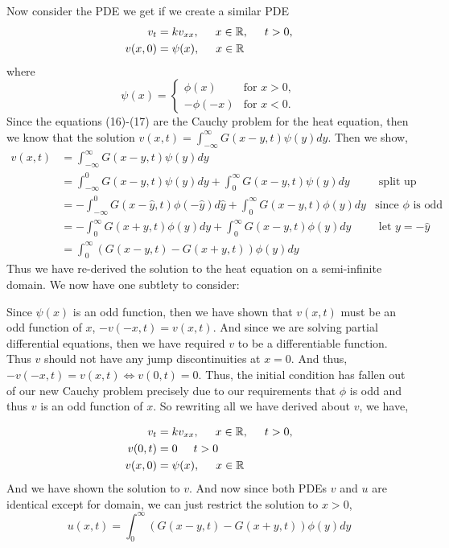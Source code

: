 \documentclass{article}
\begin{document}
\vspace{2mm} 
Now consider the PDE we get if we create a similar PDE 
\begin{align}
v_t&=kv_{xx}, \hspace{5mm} x\in\mathbb{R}, \hspace{5mm}t>0,\\
v(x,0)&= \psi(x), \hspace{5mm} x \in \mathbb{R} 
\end{align}
where 
\[
 \psi(x) =
  \begin{cases}
                                  \phi(x) & \text{for } x>0, \\
                                   -\phi(-x) & \text{for } x<0 .
  \end{cases}   
\]
Since the equations (16)-(17) are the Cauchy problem for the heat equation, then we know that the solution \(v(x,t)= \int_{-\infty}^{\infty} G(x-y,t)\psi(y) dy \). Then we show,
\begin{align*}
v(x,t) &=  \int_{-\infty}^{\infty} G(x-y,t)\psi(y) dy  \\
&=  \int_{-\infty}^{0} G(x-y,t)\psi(y) dy+ \int_{0}^{\infty} G(x-y,t)\psi(y) dy& \text{ split up integral} \\
&= - \int_{-\infty}^{0} G(x-\hat y,t)\phi(-\hat y) d\hat y+ \int_{0}^{\infty} G(x-y,t)\phi(y) dy& \text{since \(\phi \) is odd } \\
&= -\int_{0}^{\infty} G(x+y,t)\phi(y) dy+ \int_{0}^{\infty} G(x-y,t)\phi(y) dy& \text{ let \(y=-\hat y\)} \\
&= \int_{0}^{\infty} ( G(x-y,t)-G(x+y,t) )\phi(y) dy
\end{align*}
Thus we have re-derived the solution to the heat equation on a semi-infinite domain. We now have one subtlety to consider:

Since \(\psi(x)\) is an odd function, then we have shown that \(v(x,t)\) must be an odd function of \(x\), \(-v(-x,t)=v(x,t)\). And since we are solving partial differential equations, then we have required \(v \) to be a differentiable function. Thus \(v\) should not have any jump discontinuities at \(x=0\). And thus, \(-v(-x,t)=v(x,t) \iff v(0,t)=0  \). Thus, the initial condition has fallen out of our new Cauchy problem precisely due to our requirements that \(\phi \) is odd and thus \( v\) is an odd function of \(x\). So rewriting all we have derived about \(v\), we have, 

\begin{align}
v_t&=kv_{xx}, \hspace{5mm} x\in\mathbb{R}, \hspace{5mm}t>0,\\
v(0,t) &= 0  \hspace{5mm} t>0 \\
v(x,0)&= \psi(x), \hspace{5mm} x \in \mathbb{R} 
\end{align}
And we have shown the solution to \(v\). And now since both PDEs \(v\) and \(u\) are identical except for domain, we can just restrict the solution to \(x>0\), 
\[
u(x,t) = \int_{0}^{\infty} ( G(x-y,t)-G(x+y,t) )\phi(y) dy
\]
\end{document}
